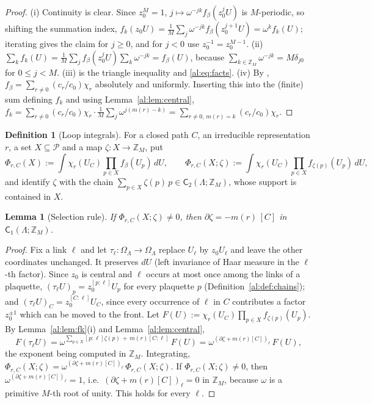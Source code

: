 \documentclass[11pt,a4paper]{article}
\newtheorem{lemma}[theorem]{Lemma}
\theoremstyle{definition}
\newtheorem{definition}[theorem]{Definition}
\theoremstyle{remark}
\newcommand{\Z}{\mathbb{Z}}
\newcommand{\cP}{\mathcal{P}}
\newcommand{\dU}{\,dU}
\newcommand{\sC}{\mathsf{C}}
\newcommand{\Flab}[2]{\cite[#1 \texttt{#2}]{F}}
\begin{document}
\begin{proof}
(i) Continuity is clear. Since $z_0^M=1$, $j\mapsto\omega^{-jk}f_\beta(z_0^jU)$ is $M$-periodic, so shifting the
summation index, $f_k(z_0U)=\frac1M\sum_j\omega^{-jk}f_\beta(z_0^{j+1}U)=\omega^k f_k(U)$; iterating gives the claim for
$j\ge0$, and for $j<0$ use $z_0^{-1}=z_0^{M-1}$. (ii) $\sum_kf_k(U)=\frac1M\sum_jf_\beta(z_0^jU)\sum_k\omega^{-jk}=f_\beta(U)$,
because $\sum_{k\in\Z_M}\omega^{-jk}=M\delta_{j0}$ for $0\le j<M$. (iii) is the triangle inequality and
\eqref{al:eq:facts}. (iv) By \Flab{Corollary}{cor:uniform}, $f_\beta=\sum_{r\neq0}(c_r/c_0)\chi_r$ absolutely and
uniformly. Inserting this into the (finite) sum defining $f_k$ and using Lemma~\ref{al:lem:central},
$f_k=\sum_{r\neq0}(c_r/c_0)\chi_r\cdot\frac1M\sum_j\omega^{j(m(r)-k)}=\sum_{r\neq0,\,m(r)=k}(c_r/c_0)\chi_r$.
\end{proof}

\begin{definition}[Loop integrals]\label{al:def:Phi}
For a closed path $C$, an irreducible representation $r$, a set $X\subseteq\cP$ and a map $\zeta:X\to\Z_M$, put
\[
\Phi_{r,C}(X):=\int\chi_r(U_C)\prod_{p\in X}f_\beta(U_p)\dU,\qquad
\Phi_{r,C}(X;\zeta):=\int\chi_r(U_C)\prod_{p\in X}f_{\zeta(p)}(U_p)\dU ,
\]
and identify $\zeta$ with the chain $\sum_{p\in X}\zeta(p)\,p\in\sC_2(\Lambda;\Z_M)$, whose support is contained in $X$.
\end{definition}

\begin{lemma}[Selection rule]\label{al:lem:selection}
If $\Phi_{r,C}(X;\zeta)\neq0$, then $\partial\zeta=-m(r)\,[C]$ in $\sC_1(\Lambda;\Z_M)$.
\end{lemma}

\begin{proof}
Fix a link $\ell$ and let $\tau_\ell:\Omega_\Lambda\to\Omega_\Lambda$ replace $U_\ell$ by $z_0U_\ell$ and leave the other
coordinates unchanged. It preserves $dU$ (left invariance of Haar measure in the $\ell$-th factor). Since $z_0$ is central
and $\ell$ occurs at most once among the links of a plaquette, $(\tau_\ell U)_p=z_0^{[p:\ell]}U_p$ for every plaquette $p$
(Definition~\ref{al:def:chains}); and $(\tau_\ell U)_C=z_0^{[C:\ell]}U_C$, since every occurrence of $\ell$ in $C$
contributes a factor $z_0^{\pm1}$ which can be moved to the front. Let $F(U):=\chi_r(U_C)\prod_{p\in X}f_{\zeta(p)}(U_p)$.
By Lemma~\ref{al:lem:fk}(i) and Lemma~\ref{al:lem:central},
\[
F(\tau_\ell U)=\omega^{\sum_{p\in X}[p:\ell]\zeta(p)\,+\,m(r)[C:\ell]}\,F(U)=\omega^{(\partial\zeta+m(r)[C])_\ell}\,F(U),
\]
the exponent being computed in $\Z_M$. Integrating, $\Phi_{r,C}(X;\zeta)=\omega^{(\partial\zeta+m(r)[C])_\ell}\,\Phi_{r,C}(X;\zeta)$.
If $\Phi_{r,C}(X;\zeta)\neq0$, then $\omega^{(\partial\zeta+m(r)[C])_\ell}=1$, i.e.\ $(\partial\zeta+m(r)[C])_\ell=0$
in $\Z_M$, because $\omega$ is a primitive $M$-th root of unity. This holds for every $\ell$.
\end{proof}
\end{document}
